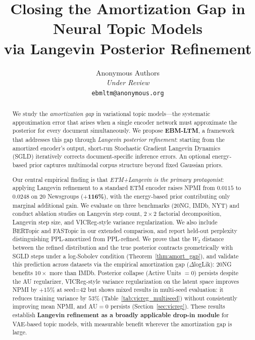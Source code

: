 \documentclass[10pt]{article}
\title{%
    \vspace{-1em}
    \textbf{\Large Closing the Amortization Gap in Neural Topic Models}\\[0.3em]
    \textbf{\large via Langevin Posterior Refinement}
}
\author{%
    Anonymous Authors\\
    \textit{Under Review}\\[0.3em]
    {\small \texttt{ebmltm@anonymous.org}}
}
\date{}
\begin{document}
\maketitle
\thispagestyle{fancy}

\begin{abstract}
We study the \emph{amortization gap} in variational topic models---the systematic
approximation error that arises when a single encoder network must approximate the
posterior for every document simultaneously.
We propose \textbf{EBM-LTM}, a framework that addresses this gap through
\emph{Langevin posterior refinement}: starting from the amortized encoder's output,
short-run Stochastic Gradient Langevin Dynamics (SGLD) iteratively corrects
document-specific inference errors. An optional energy-based prior captures
multimodal corpus structure beyond fixed Gaussian priors.

Our central empirical finding is that \emph{ETM+Langevin is the primary protagonist}:
applying Langevin refinement to a standard ETM encoder raises NPMI from $0.0115$ to
$0.0248$ on 20 Newsgroups (+\textbf{116\%}), with the energy-based prior contributing
only marginal additional gain.
We evaluate on three benchmarks (20NG, IMDb, NYT) and conduct ablation studies on
Langevin step count, $2\times2$ factorial decomposition, Langevin step size, and
VICReg-style variance regularization.
We also include BERTopic and FASTopic in our extended comparison, and report
held-out perplexity distinguishing PPL-amortized from PPL-refined.
We prove that the $W_2$ distance between the refined distribution and the true
posterior contracts geometrically with SGLD steps under a log-Sobolev condition
(Theorem~\ref{thm:amort_gap}), and validate this prediction across datasets via
the empirical amortization gap ($\Delta$logLik): 20NG benefits $10\times$ more than IMDb.
Posterior collapse (Active Units $= 0$) persists despite the AU regularizer,
VICReg-style variance regularization on the latent space improves NPMI
by $+15\%$ at seed=42 but shows mixed results in multi-seed evaluation:
it reduces training variance by $53\%$ (Table~\ref{tab:vicreg_multiseed})
without consistently improving mean NPMI, and AU$=0$ persists
(Section~\ref{sec:vicreg}).
These results establish \textbf{Langevin refinement as a broadly applicable
drop-in module} for VAE-based topic models, with measurable benefit wherever
the amortization gap is large.
\end{abstract}
\end{document}
